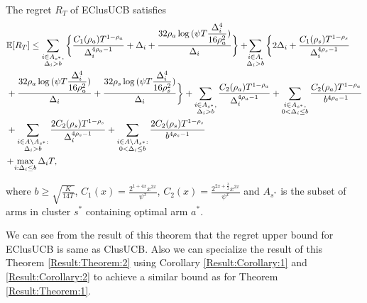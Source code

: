 \begin{theorem}
\label{Result:Theorem:2}
The regret $R_T$ of EClusUCB satisfies
\begin{align*}
&\mathbb{E} [R_{T}]\leq 
\sum\limits_{\substack{i\in A_{s^{*}},\\\Delta_{i} > b}}\bigg\lbrace \dfrac{C_1(\rho_{a})T^{1-\rho_{a}}}{\Delta_{i}^{4\rho_{a}-1}} + \Delta_{i}
 + \frac{32\rho_{a}\log{(\psi T\dfrac{\Delta_{i}^{4}}{16\rho_{a}^{2}})}}{\Delta_{i}} \bigg\rbrace
 + \! \! \sum\limits_{\substack{i\in A,\\\Delta_{i} > b}} \bigg\lbrace 2\Delta_{i}+
\dfrac{C_1(\rho_{s})T^{1-\rho_{s}}}{\Delta_{i}^{4\rho_{s}-1}} \\
&+ \frac{32\rho_{a}\log{(\psi T\dfrac{\Delta_{i}^{4}}{16\rho_{a}^{2}})}}{\Delta_{i}} 
+ \dfrac{32\rho_{s}\log{(\psi T\dfrac{\Delta_{i}^{4}}{16\rho_{s}^{2}})}}{\Delta_{i}}\bigg\rbrace
+ \sum\limits_{\substack{i\in A_{s^{*}},\\ \Delta_{i} > b}} 
\frac{C_2(\rho_{a})T^{1-\rho_{a}}}{\Delta_{i}^{4\rho_{a}-1}}
+\sum\limits_{\substack{i\in A_{s^{*}},\\0 < \Delta_{i}\leq b}}\frac{C_2(\rho_a)T^{1-\rho_{a}}}{b^{4\rho_{a} -1}}\\ 
&+ \sum_{\substack{i\in A\setminus A_{s^*}:\\\Delta_{i}> b}}\dfrac{2C_{2}(\rho_{s})T^{1-\rho_{s}}}{\Delta_{i}^{4\rho_{s}-1}} +\sum_{\substack{i\in A \setminus A_{s^*}:\\ 0 < \Delta_{i} \leq b}}\dfrac{2C_{2}(\rho_{s})T^{1-\rho_{s}}}{b^{4\rho_{s}-1}}\\
& \!+\! \max\limits_{i:\Delta_{i}\leq b}\Delta_{i}T, 
\end{align*}

where $b\geq \sqrt{\frac{K}{14 T}}$, $C_1(x) = \frac{2^{1+4x}x^{2x}}{\psi^{x}}$, $C_2(x) = \frac{2^{2x+\frac{3}{2}}x^{2x}}{\psi^{x}}$ and $A_{s^{*}}$ is the subset of arms in cluster $s^{*}$ containing optimal arm $a^{*}$.
\end{theorem}

We can see from the result of this theorem that the regret upper bound for EClusUCB is same as ClusUCB. Also we can specialize the result of this Theorem \ref{Result:Theorem:2} using Corollary \ref{Result:Corollary:1} and \ref{Result:Corollary:2} to achieve a similar bound as for Theorem \ref{Result:Theorem:1}.


